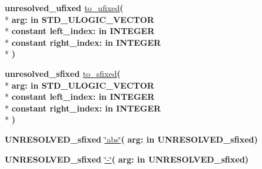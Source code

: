 \begin{DoxyCompactItemize}
\item 
{\bfseries {\bfseries \textcolor{vhdlchar}{unresolved\+\_\+ufixed}\textcolor{vhdlchar}{ }}} \hyperlink{class__fixed__pkg_a8dade4ccd486403422799795e2504d18}{to\+\_\+ufixed}{\bfseries  ( }\\*
{\bfseries \textcolor{vhdlchar}{arg\+: }\textcolor{stringliteral}{in }{\bfseries \textcolor{comment}{S\+T\+D\+\_\+\+U\+L\+O\+G\+I\+C\+\_\+\+V\+E\+C\+T\+O\+R}\textcolor{vhdlchar}{ }}}\\*
{\bfseries {\bfseries \textcolor{keywordflow}{constant}\textcolor{vhdlchar}{ }}\textcolor{vhdlchar}{left\+\_\+index\+: }\textcolor{stringliteral}{in }{\bfseries \textcolor{comment}{I\+N\+T\+E\+G\+E\+R}\textcolor{vhdlchar}{ }}}\\*
{\bfseries {\bfseries \textcolor{keywordflow}{constant}\textcolor{vhdlchar}{ }}\textcolor{vhdlchar}{right\+\_\+index\+: }\textcolor{stringliteral}{in }{\bfseries \textcolor{comment}{I\+N\+T\+E\+G\+E\+R}\textcolor{vhdlchar}{ }}}\\*
{\bfseries  )} 
\item 
{\bfseries {\bfseries \textcolor{vhdlchar}{unresolved\+\_\+sfixed}\textcolor{vhdlchar}{ }}} \hyperlink{class__fixed__pkg_af615b41794aa5a68c7880fa811042af6}{to\+\_\+sfixed}{\bfseries  ( }\\*
{\bfseries \textcolor{vhdlchar}{arg\+: }\textcolor{stringliteral}{in }{\bfseries \textcolor{comment}{S\+T\+D\+\_\+\+U\+L\+O\+G\+I\+C\+\_\+\+V\+E\+C\+T\+O\+R}\textcolor{vhdlchar}{ }}}\\*
{\bfseries {\bfseries \textcolor{keywordflow}{constant}\textcolor{vhdlchar}{ }}\textcolor{vhdlchar}{left\+\_\+index\+: }\textcolor{stringliteral}{in }{\bfseries \textcolor{comment}{I\+N\+T\+E\+G\+E\+R}\textcolor{vhdlchar}{ }}}\\*
{\bfseries {\bfseries \textcolor{keywordflow}{constant}\textcolor{vhdlchar}{ }}\textcolor{vhdlchar}{right\+\_\+index\+: }\textcolor{stringliteral}{in }{\bfseries \textcolor{comment}{I\+N\+T\+E\+G\+E\+R}\textcolor{vhdlchar}{ }}}\\*
{\bfseries  )} 
\item 
{\bfseries {\bfseries \textcolor{vhdlchar}{U\+N\+R\+E\+S\+O\+L\+V\+E\+D\+\_\+sfixed}\textcolor{vhdlchar}{ }}} \hyperlink{class__fixed__pkg_a38c1c4c6b1f76cfc07b009c92acabab5}{\char`\"{}abs\char`\"{}}{\bfseries  ( }{\bfseries \textcolor{vhdlchar}{arg\+: }\textcolor{stringliteral}{in }\textcolor{vhdlchar}{U\+N\+R\+E\+S\+O\+L\+V\+E\+D\+\_\+sfixed}}{\bfseries  )} 
\item 
{\bfseries {\bfseries \textcolor{vhdlchar}{U\+N\+R\+E\+S\+O\+L\+V\+E\+D\+\_\+sfixed}\textcolor{vhdlchar}{ }}} \hyperlink{class__fixed__pkg_acc47f8e7fbecebc0fc011d8431f076fd}{\char`\"{}-\/\char`\"{}}{\bfseries  ( }{\bfseries \textcolor{vhdlchar}{arg\+: }\textcolor{stringliteral}{in }\textcolor{vhdlchar}{U\+N\+R\+E\+S\+O\+L\+V\+E\+D\+\_\+sfixed}}{\bfseries  )} 

\end{DoxyCompactItemize}
